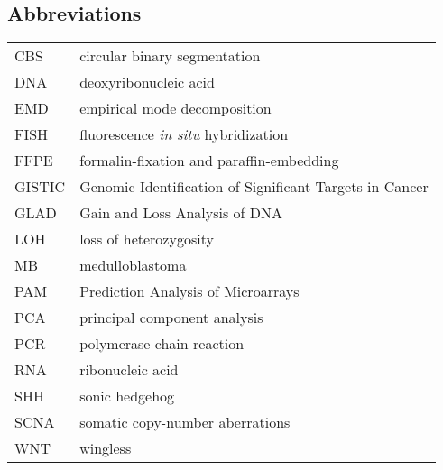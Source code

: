\begin{center}
	\section*{Abbreviations}
\end{center}

\begin{tabular}{l l}
CBS & circular binary segmentation \\
DNA & deoxyribonucleic acid \\
EMD & empirical mode decomposition \\
FISH & fluorescence \emph{in situ} hybridization \\
FFPE & formalin-fixation and paraffin-embedding \\
GISTIC & Genomic Identification of Significant Targets in Cancer \\
GLAD & Gain and Loss Analysis of DNA \\
LOH & loss of heterozygosity \\
MB & medulloblastoma \\
PAM & Prediction Analysis of Microarrays \\
PCA & principal component analysis \\
PCR & polymerase chain reaction \\
RNA & ribonucleic acid \\
SHH & sonic hedgehog \\
SCNA & somatic copy-number aberrations \\
WNT & wingless \\
\end{tabular}
